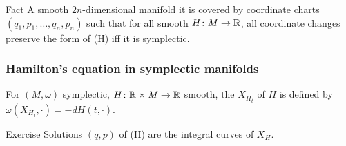\begin{frame}
  \vspace{0.5\baselineskip}
  \begin{block}{Fact}
    A smooth $2n$-dimensional manifold it is covered by coordinate charts $(q_1, p_1,\dots, q_n, p_n)$ such that for all smooth $H\colon M\to\mathbb{R}$, all coordinate changes preserve the form of (H) iff it is symplectic.
  \end{block}
\end{frame}

\begin{frame}
  \frametitle{Hamilton's equation in symplectic manifolds}
  \begin{definition}
    For $(M, \omega)$ symplectic, $H\colon \mathbb{R}\times M\to\mathbb{R}$ smooth, the  $X_{H_t}$ of $H$ is defined by $\omega(X_{H_t}, \cdot) = -dH(t,\cdot)$.
  \end{definition}
  \begin{block}{Exercise}
    Solutions $(q,p)$ of (H) are the integral curves of $X_H$.
  \end{block}
\end{frame}

